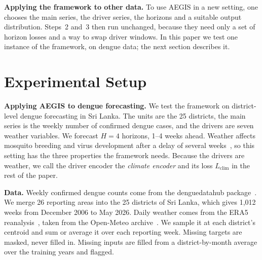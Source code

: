 \documentclass[conference]{IEEEtran}
\newcommand{\fw}{AEGIS}
\begin{document}
\textbf{Applying the framework to other data.} To use \fw{} in a new setting, one chooses the main series, the driver series, the horizons and a suitable output distribution. Steps~2 and~3 then run unchanged, because they need only a set of horizon losses and a way to swap driver windows. In this paper we test one instance of the framework, on dengue data; the next section describes it.

\section{Experimental Setup}\label{sec:setup}

\textbf{Applying \fw{} to dengue forecasting.} We test the framework on district-level dengue forecasting in Sri Lanka. The units are the 25 districts, the main series is the weekly number of confirmed dengue cases, and the drivers are seven weather variables. We forecast $H = 4$ horizons, 1--4 weeks ahead. Weather affects mosquito breeding and virus development after a delay of several weeks~\cite{liu2025explainable,lowe2018barbados}, so this setting has the three properties the framework needs. Because the drivers are weather, we call the driver encoder the \emph{climate encoder} and its loss $L_{\mathrm{clim}}$ in the rest of the paper.

\textbf{Data.} Weekly confirmed dengue counts come from the denguedatahub package~\cite{talagala2026denguedatahub}. We merge 26 reporting areas into the 25 districts of Sri Lanka, which gives 1,012 weeks from December 2006 to May 2026. Daily weather comes from the ERA5 reanalysis~\cite{munoz2021era5land}, taken from the Open-Meteo archive~\cite{openmeteo2026historical}. We sample it at each district's centroid and sum or average it over each reporting week. Missing targets are masked, never filled in. Missing inputs are filled from a district-by-month average over the training years and flagged.
\end{document}
